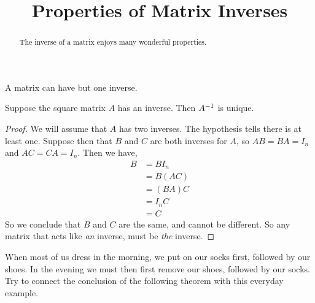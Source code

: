 \documentclass{ximera}
\title{Properties of Matrix Inverses}
\begin{document}
\begin{abstract}
  The inverse of a matrix enjoys many wonderful properties.
\end{abstract}
\maketitle

A matrix can have but one inverse.

\begin{theorem}
  \label{theorem:MIU}
  
  Suppose the square matrix $A$ has an inverse.  Then $A^{-1}$ is
  unique.

  \begin{proof}
    We will assume that $A$ has two inverses.  The hypothesis tells
    there is at least one.  Suppose then that $B$ and $C$ are both
    inverses for $A$, so $AB=BA=I_n$ and $AC=CA=I_n$.  Then we have,
    \begin{align*}
      B
      &=BI_n\\
      &=B(AC)\\
      &=(BA)C\\
      &=I_nC \\
      &=C
    \end{align*}
    So we conclude that $B$ and $C$ are the same, and cannot be different.  So any matrix that acts like \textit{an} inverse, must be \textit{the} inverse.
  \end{proof}
\end{theorem}

When most of us dress in the morning, we put on our socks first,
followed by our shoes.  In the evening we must then first remove our
shoes, followed by our socks.  Try to connect the conclusion of the
following theorem with this everyday example.
\end{document}
